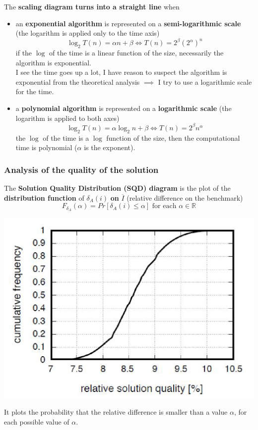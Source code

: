 The \textbf{scaling diagram turns into a straight line} when
\begin{itemize}
	\item an \textbf{exponential algorithm} is represented on a \textbf{semi-logarithmic scale} (the logarithm is applied only to the time axis)
	$$ \log_2 T(n) = \alpha n + \beta \Leftrightarrow T(n) = 2^\beta \left(2^\alpha\right)^n $$
	if the $\log$ of the time is a linear function of the size, necessarily the algorithm is exponential.\\
	I see the time goes up a lot, I have reason to suspect the algorithm is exponential from the theoretical analysis $\implies$ I try to use a logarithmic scale for the time.\\
	
	\item a \textbf{polynomial algorithm} is represented on a \textbf{logarithmic scale} (the logarithm is applied to both axes)
	$$ \log_2 T(n) = \alpha\log_2 n + \beta \Leftrightarrow T(n) = 2^\beta n^\alpha $$
	the $\log$ of the time is a $\log$ function of the size, then the computational time is polynomial ($\alpha$ is the exponent).\\
\end{itemize}

\newpage

\subsubsection{Analysis of the quality of the solution}
The \textbf{Solution Quality Distribution (SQD) diagram} is the plot of the \textbf{distribution function} of $\delta_A (i)$ \textbf{on} $\overline{I}$ (relative difference on the benchmark)
$$ F_{\delta_A} (\alpha) = Pr \left[\delta_A (i) \leq \alpha\right] \text{ for each } \alpha \in \mathbb{R} $$
\begin{center}
	\includegraphics[width=0.7\columnwidth]{img/SQD1}
\end{center}
It plots the probability that the relative difference is smaller than a value $\alpha$, for each possible value of $\alpha$. \\


